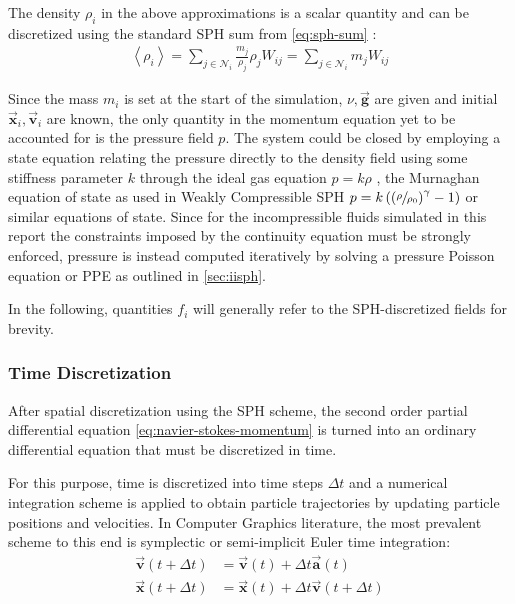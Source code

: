 \documentclass[oneside, a4paper]{book}
\newcommand\angled[1]{\left\langle#1\right\rangle}
\newcommand\vek[1]{\vec{\bm{#1}}}
\newcommand\br[1]{\left(#1\right)}
\begin{document}
    The density $\rho_i$ in the above approximations is a scalar quantity and can be discretized using the standard SPH sum from \autoref{eq:sph-sum} \autocite{tutorial2019}:
    \begin{align}\label{eq:discrete-density}
      \angled{\rho_i}  
      = \sum_{j\in\mathcal{N}_i} \frac{m_j}{\rho_j} \rho_j W_{ij} 
      = \sum_{j\in\mathcal{N}_i} m_j W_{ij} 
    \end{align}

    Since the mass $m_i$ is set at the start of the simulation, $\nu,\vek{g}$ are given and initial $\vek{x}_i, \vek{v}_i$ are known, the only quantity in the momentum equation yet to be accounted for is the pressure field $p$. The system could be closed by employing a state equation relating the pressure directly to the density field using some stiffness parameter $k$ through the ideal gas equation $p=k\rho$ \autocite{müller-2003}, the Murnaghan equation of state \autocite{murnaghan-eos} as used in Weakly Compressible SPH \autocite{wcsph} $p=k\br{\br{\sfrac{\rho}{\rho_0}}^\gamma-1}$ or similar equations of state. Since for the incompressible fluids simulated in this report the constraints imposed by the continuity equation must be strongly enforced, pressure is instead computed iteratively by solving a pressure Poisson equation or PPE as outlined in \autoref{sec:iisph}.

    In the following, quantities $f_i$ will generally refer to the SPH-discretized fields for brevity.

    \subsubsection{Time Discretization}
    After spatial discretization using the SPH scheme, the second order partial differential equation \autoref{eq:navier-stokes-momentum} is turned into an ordinary differential equation \autocite{tutorial2019} that must be discretized in time. 

    For this purpose, time is discretized into time steps $\Delta t$ and a numerical integration scheme is applied to obtain particle trajectories by updating particle positions and velocities. In Computer Graphics literature, the most prevalent scheme \autocites{tutorial2019}{wcsph}{iisph}{iisph-flip}{dfsph} to this end is symplectic or semi-implicit Euler time integration:
    \begin{align}\label{eq:numerical-time-integration}
      \vek{v}(t+\Delta t) &= \vek{v}(t) + \Delta t \vek{a}(t)\\
      \vek{x}(t+\Delta t) &= \vek{x}(t) + \Delta t \vek{v}(t+\Delta t)
    \end{align}
\end{document}
